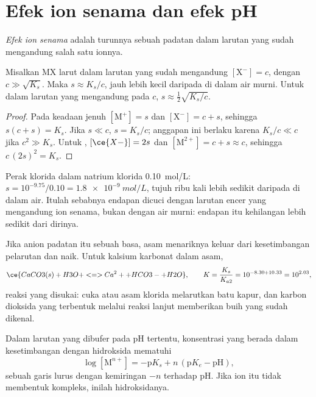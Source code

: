 \section{Efek ion senama dan efek pH}

\begin{definition}\label{def:b1:precipitation:common-ion}
\emph{Efek ion senama} adalah turunnya 
sebuah padatan dalam larutan yang sudah mengandung salah satu ionnya.
\end{definition}

\begin{proposition}\label{prop:b1:precipitation:common-ion}
Misalkan MX larut dalam larutan yang sudah mengandung $[\mathrm{X}^-] = c$,
dengan $c \gg \sqrt{K_s}$. Maka $s \approx K_s/c$, jauh lebih kecil
daripada di dalam air murni. Untuk  dalam larutan yang
mengandung  pada $c$, $s \approx \frac12\sqrt{K_s/c}$.
\end{proposition}

\begin{proof}
Pada keadaan jenuh $[\mathrm{M}^+] = s$ dan $[\mathrm{X}^-] = c + s$,
sehingga $s(c + s) = K_s$. Jika $s \ll c$, $s = K_s/c$; anggapan ini
berlaku karena $K_s/c \ll c$ jika $c^2 \gg K_s$. Untuk ,
$[\ce{X-}] = 2s$ dan $[\mathrm{M}^{2+}] = c + s \approx c$, sehingga
$c\,(2s)^2 = K_s$.
\end{proof}

Perak klorida dalam natrium klorida \qty{0.10}{mol/L}: $s = 10^{-9.75}/0.10
= \qty{1.8e-9}{mol/L}$, tujuh ribu kali lebih sedikit daripada di dalam
air. Itulah sebabnya endapan dicuci dengan larutan encer yang mengandung
ion senama, bukan dengan air murni: endapan itu kehilangan lebih sedikit
dari dirinya.

Jika anion padatan itu sebuah basa, asam menariknya keluar dari
kesetimbangan pelarutan dan  naik. Untuk kalsium karbonat
dalam asam,
\[
  \ce{CaCO3(s) + H3O+ <=> Ca^2+ + HCO3- + H2O}, \qquad
  K = \frac{K_s}{K_{a2}} = 10^{-8.30 + 10.33} = 10^{2.03} ,
\]
reaksi yang disukai: cuka atau asam klorida melarutkan batu kapur, dan
karbon dioksida yang terbentuk melalui reaksi lanjut  memberikan
buih yang sudah dikenal.

\begin{proposition}\label{prop:b1:precipitation:hydroxide-ph}
Dalam larutan yang dibufer pada pH tertentu, konsentrasi  yang
berada dalam kesetimbangan dengan hidroksida  mematuhi
\[
  \log[\mathrm{M}^{n+}] = -\mathrm{p}K_s + n\,(\mathrm{p}K_e - \mathrm{pH}) ,
\]
sebuah garis lurus dengan kemiringan $-n$ terhadap pH. Jika ion itu tidak
membentuk kompleks, inilah  hidroksidanya.
\end{proposition}

